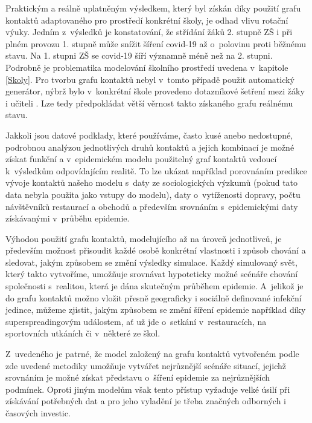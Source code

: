 Praktickým a reálně uplatněným výsledkem, který byl získán díky použití grafu kontaktů adaptovaného pro prostředí konkrétní školy, je odhad vlivu rotační výuky. Jedním z~výsledků je konstatování, že střídání žáků 2. stupně ZŠ i při plném provozu 1. stupně může snížit šíření covid-19 až o~polovinu proti běžnému stavu. Na 1. stupni ZŠ se covid-19 šíří významně méně než na 2. stupni. Podrobně je problematika modelování školního prostředí uvedena v~kapitole \ref{Skoly}. Pro tvorbu grafu kontaktů nebyl v~tomto případě použit automatický generátor, nýbrž bylo v~konkrétní škole provedeno dotazníkové šetření mezi žáky i učiteli \cite{BISOP-VZ-sireni-skoly}. Lze tedy předpokládat větší věrnost takto získaného grafu reálnému stavu.


Jakkoli jsou datové podklady, které používáme, často kusé anebo nedostupné, podrobnou analýzou jednotlivých druhů kontaktů a jejich kombinací je možné získat funkční a v~epidemickém modelu použitelný graf kontaktů vedoucí k~výsledkům odpovídajícím realitě. To lze ukázat například porovnáním predikce vývoje kontaktů našeho modelu s~daty ze sociologických výzkumů (pokud tato data nebyla použita jako vstupy do modelu), daty o~vytíženosti dopravy, počtu návštěvníků restaurací a obchodů a především srovnáním s~epidemickými daty získávanými v~průběhu epidemie. 

Výhodou použití grafu kontaktů, modelujícího až na úroveň jednotlivců, je především možnost přisoudit každé osobě konkrétní vlastnosti i způsob chování a sledovat, jakým způsobem se změní výsledky simulace. Každý simulovaný svět, který takto vytvoříme, umožňuje srovnávat hypoteticky možné scénáře chování společnosti s~realitou, která je dána skutečným průběhem epidemie. A~jelikož je do grafu kontaktů možno vložit přesně geograficky i sociálně definované infekční jedince, můžeme zjistit, jakým způsobem se změní šíření epidemie například díky superspreadingovým událostem, ať už jde o~setkání v~restauracích, na sportovních utkáních či v~některé ze škol. 

Z~uvedeného je patrné, že model založený na grafu kontaktů vytvořeném podle zde uvedené metodiky umožňuje vytvářet nejrůznější scénáře situací, jejichž srovnáním je možné získat představu o~šíření epidemie za nejrůznějších podmínek. Oproti jiným modelům však tento přístup vyžaduje velké úsilí při získávání potřebných dat a pro jeho vyladění je třeba značných odborných i časových investic.



